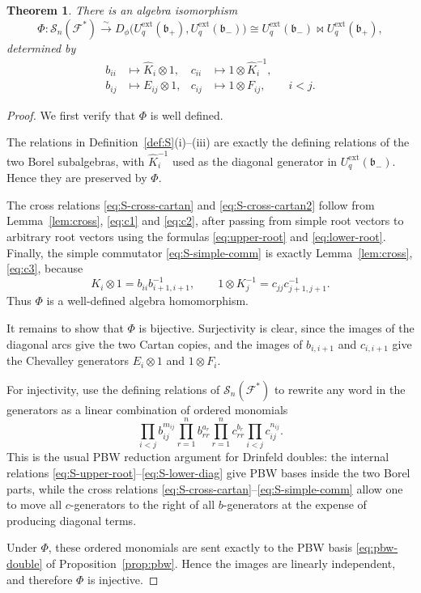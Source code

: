 \documentclass[11pt]{article}
\newtheorem{theorem}{Theorem}
\theoremstyle{definition}
\newcommand{\Uq}{U_q^{\mathrm{ext}}}
\newcommand{\fb}{\mathfrak{b}}
\newcommand{\F}{\mathcal{F}}
\newcommand{\cS}{\mathcal{S}}
\newcommand{\bipr}{\bowtie}
\newcommand{\KK}{\hat K}
\begin{document}
\begin{theorem}
\label{thm:isom}
There is an algebra isomorphism
\[
\Phi:\cS_n(\F^*)
\overset{\sim}{\longrightarrow}
D_\phi\bigl(\Uq(\fb_+),\Uq(\fb_-)\bigr)
\cong
\Uq(\fb_-)\bipr\Uq(\fb_+),
\]
determined by
\begin{align*}
b_{ii}&\longmapsto \KK_i\otimes 1,
&
c_{ii}&\longmapsto 1\otimes \KK_i^{-1},
\\
b_{ij}&\longmapsto E_{ij}\otimes 1,
&
c_{ij}&\longmapsto 1\otimes F_{ij},
\qquad i<j.
\end{align*}
\end{theorem}

\begin{proof}
We first verify that $\Phi$ is well defined.

The relations in Definition~\ref{def:S}(i)--(iii) are exactly the defining
relations of the two Borel subalgebras, with $\KK_i^{-1}$ used as the diagonal
generator in $\Uq(\fb_-)$. Hence they are preserved by $\Phi$.

The cross relations \eqref{eq:S-cross-cartan} and \eqref{eq:S-cross-cartan2}
follow from Lemma~\ref{lem:cross}, \eqref{eq:c1} and \eqref{eq:c2}, after
passing from simple root vectors to arbitrary root vectors using the formulas
\eqref{eq:upper-root} and \eqref{eq:lower-root}. Finally, the simple commutator
\eqref{eq:S-simple-comm} is exactly Lemma~\ref{lem:cross}, \eqref{eq:c3},
because
\[
K_i\otimes 1
=
b_{ii}b_{i+1,i+1}^{-1},
\qquad
1\otimes K_j^{-1}
=
c_{jj}c_{j+1,j+1}^{-1}.
\]
Thus $\Phi$ is a well-defined algebra homomorphism.

It remains to show that $\Phi$ is bijective. Surjectivity is clear, since the
images of the diagonal arcs give the two Cartan copies, and the images of
$b_{i,i+1}$ and $c_{i,i+1}$ give the Chevalley generators $E_i\otimes 1$ and
$1\otimes F_i$.

For injectivity, use the defining relations of $\cS_n(\F^*)$ to rewrite any
word in the generators as a linear combination of ordered monomials
\[
\prod_{i<j}b_{ij}^{m_{ij}}
\prod_{r=1}^n b_{rr}^{a_r}
\prod_{r=1}^n c_{rr}^{b_r}
\prod_{i<j}c_{ij}^{n_{ij}}.
\]
This is the usual PBW reduction argument for Drinfeld doubles: the internal
relations \eqref{eq:S-upper-root}--\eqref{eq:S-lower-diag} give PBW bases inside
the two Borel parts, while the cross relations
\eqref{eq:S-cross-cartan}--\eqref{eq:S-simple-comm} allow one to move all
$c$-generators to the right of all $b$-generators at the expense of producing
diagonal terms.

Under $\Phi$, these ordered monomials are sent exactly to the PBW basis
\eqref{eq:pbw-double} of Proposition~\ref{prop:pbw}. Hence the images are
linearly independent, and therefore $\Phi$ is injective.
\end{proof}
\end{document}

